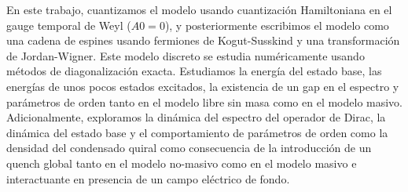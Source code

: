En este trabajo, cuantizamos el modelo usando cuantización Hamiltoniana en el gauge temporal de Weyl ($A0=0$), y posteriormente escribimos el modelo como una cadena de espines usando fermiones de Kogut-Susskind y una transformación de Jordan-Wigner. Este modelo discreto se estudia numéricamente usando métodos de diagonalización exacta. Estudiamos la energía del estado base, las energías de unos pocos estados excitados, la existencia de un gap en el espectro y parámetros de orden tanto en el modelo libre sin masa como en el modelo masivo. Adicionalmente, exploramos la dinámica del espectro del operador de Dirac, la dinámica del estado base y el comportamiento de parámetros de orden como la densidad del condensado quiral como consecuencia de la introducción de un quench global tanto en el modelo no-masivo como en el modelo masivo e interactuante en presencia de un campo eléctrico de fondo.
